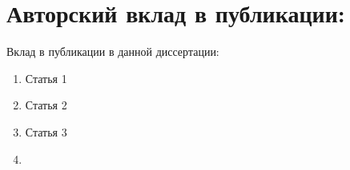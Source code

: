 \chapter*{Авторский вклад в публикации:}
Вклад в публикации в данной диссертации:

\begin{enumerate}[label=\Roman*., leftmargin=\parindent, align=left]
	\item Статья 1
	\item Статья 2
	\item Статья 3
	\item
\end{enumerate}
	